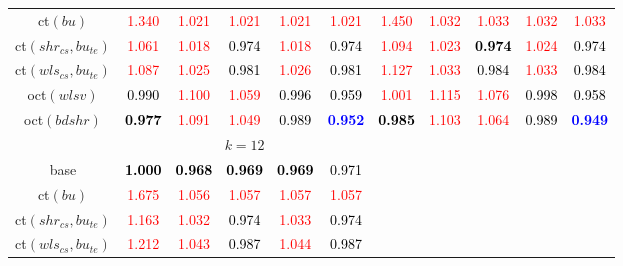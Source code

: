 \begin{tabular}[t]{c|>{}cccc>{}c|ccccc}
ct$(bu)$ & \textcolor{red}{1.340} & \textcolor{red}{1.021} & \textcolor{red}{1.021} & \textcolor{red}{1.021} & \textcolor{red}{1.021} & \textcolor{red}{1.450} & \textcolor{red}{1.032} & \textcolor{red}{1.033} & \textcolor{red}{1.032} & \textcolor{red}{1.033}\\
ct$(shr_{cs}, bu_{te})$ & \textcolor{red}{1.061} & \textcolor{red}{1.018} & \textcolor{black}{0.974} & \textcolor{red}{1.018} & \textcolor{black}{0.974} & \textcolor{red}{1.094} & \textcolor{red}{1.023} & \textcolor{black}{\textbf{0.974}} & \textcolor{red}{1.024} & \textcolor{black}{0.974}\\
ct$(wls_{cs}, bu_{te})$ & \textcolor{red}{1.087} & \textcolor{red}{1.025} & \textcolor{black}{0.981} & \textcolor{red}{1.026} & \textcolor{black}{0.981} & \textcolor{red}{1.127} & \textcolor{red}{1.033} & \textcolor{black}{0.984} & \textcolor{red}{1.033} & \textcolor{black}{0.984}\\
oct$(wlsv)$ & \textcolor{black}{0.990} & \textcolor{red}{1.100} & \textcolor{red}{1.059} & \textcolor{black}{0.996} & \textcolor{black}{0.959} & \textcolor{red}{1.001} & \textcolor{red}{1.115} & \textcolor{red}{1.076} & \textcolor{black}{0.998} & \textcolor{black}{0.958}\\
oct$(bdshr)$ & \textcolor{black}{\textbf{0.977}} & \textcolor{red}{1.091} & \textcolor{red}{1.049} & \textcolor{black}{0.989} & \textcolor{blue}{\textbf{0.952}} & \textcolor{black}{\textbf{0.985}} & \textcolor{red}{1.103} & \textcolor{red}{1.064} & \textcolor{black}{0.989} & \textcolor{blue}{\textbf{0.949}}\\
\addlinespace[0.3em]
\multicolumn{1}{c}{} & \multicolumn{5}{c}{\textbf{$k = 12$}} & \multicolumn{5}{c}{}\\
base & \textcolor{black}{\textbf{1.000}} & \textcolor{black}{\textbf{0.968}} & \textcolor{black}{\textbf{0.969}} & \textcolor{black}{\textbf{0.969}} & \textcolor{black}{0.971} &  &  &  &  & \\
ct$(bu)$ & \textcolor{red}{1.675} & \textcolor{red}{1.056} & \textcolor{red}{1.057} & \textcolor{red}{1.057} & \textcolor{red}{1.057} &  &  &  &  & \\
ct$(shr_{cs}, bu_{te})$ & \textcolor{red}{1.163} & \textcolor{red}{1.032} & \textcolor{black}{0.974} & \textcolor{red}{1.033} & \textcolor{black}{0.974} &  &  &  &  & \\
ct$(wls_{cs}, bu_{te})$ & \textcolor{red}{1.212} & \textcolor{red}{1.043} & \textcolor{black}{0.987} & \textcolor{red}{1.044} & \textcolor{black}{0.987} &  &  &  &  & \\

\end{tabular}
